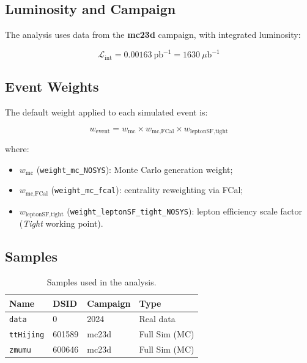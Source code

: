 \documentclass[12pt,a4paper]{article}
\begin{document}
\subsection{Luminosity and Campaign}

The analysis uses data from the \textbf{mc23d} campaign, with integrated luminosity:

\begin{equation}
    \mathcal{L}_{\text{int}} = 0.00163\ \text{pb}^{-1} = 1630\ \mu\text{b}^{-1}
\end{equation}

\subsection{Event Weights}

The default weight applied to each simulated event is:

\begin{equation}
    w_{\text{event}} = w_{\text{mc}} \times w_{\text{mc,FCal}} \times w_{\text{leptonSF,tight}}
\end{equation}

where:
\begin{itemize}
    \item $w_{\text{mc}}$ (\texttt{weight\_mc\_NOSYS}): Monte Carlo generation weight;
    \item $w_{\text{mc,FCal}}$ (\texttt{weight\_mc\_fcal}): centrality reweighting via FCal;
    \item $w_{\text{leptonSF,tight}}$ (\texttt{weight\_leptonSF\_tight\_NOSYS}): lepton efficiency scale factor (\textit{Tight} working point).
\end{itemize}

\subsection{Samples}

\begin{table}[h!]
\centering
\caption{Samples used in the analysis.}
\begin{tabular}{llll}
\toprule
\textbf{Name} & \textbf{DSID} & \textbf{Campaign} & \textbf{Type} \\
\midrule
\texttt{data}     & 0      & 2024  & Real data \\
\texttt{ttHijing} & 601589 & mc23d & Full Sim (MC) \\
\texttt{zmumu}    & 600646 & mc23d & Full Sim (MC) \\
\bottomrule
\end{tabular}
\end{table}
\end{document}
